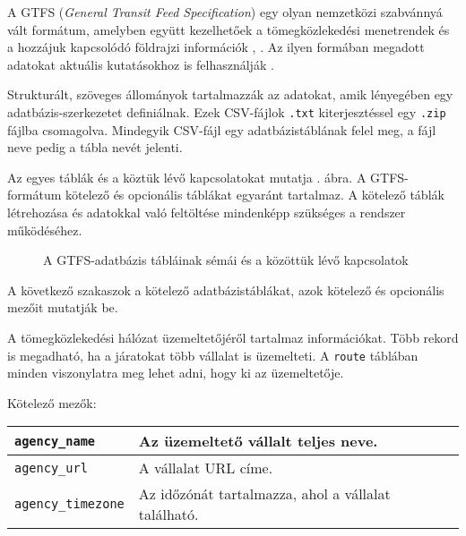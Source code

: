 
A GTFS (\textit{General Transit Feed Specification}) egy olyan nemzetközi szabvánnyá vált formátum, amelyben együtt kezelhetőek a tömegközlekedési menetrendek és a hozzájuk kapcsolódó földrajzi információk \cite{gtfs}, \cite{gtfsspec}. Az ilyen formában megadott adatokat aktuális kutatásokhoz is felhasználják \cite{crowdsending}.

Strukturált, szöveges állományok tartalmazzák az adatokat, amik lényegében egy adatbázis-szerkezetet definiálnak. Ezek CSV-fájlok \texttt{.txt} kiterjesztéssel egy \texttt{.zip} fájlba csomagolva. Mindegyik CSV-fájl egy adatbázistáblának felel meg, a fájl neve pedig a tábla nevét jelenti.

Az egyes táblák és a köztük lévő kapcsolatokat mutatja . ábra. A GTFS-formátum kötelező és opcionális táblákat egyaránt tartalmaz. A kötelező táblák létrehozása és adatokkal való feltöltése mindenképp szükséges a rendszer működéséhez.


\begin{figure}
\centering

\caption{A GTFS-adatbázis tábláinak sémái és a közöttük lévő kapcsolatok}
\label{fig:gtfs}
\end{figure}


A következő szakaszok a kötelező adatbázistáblákat, azok kötelező és opcionális mezőit mutatják be.


A tömegközlekedési hálózat üzemeltetőjéről tartalmaz információkat. Több rekord is megadható, ha a járatokat több vállalat is üzemelteti. A \texttt{route} táblában minden viszonylatra meg lehet adni, hogy ki az üzemeltetője.

\medskip

\noindent Kötelező mezők:

\bigskip

\begin{tabular}{|p{3.5cm}|p{10cm}|}
\hline
\texttt{agency\_name} & Az üzemeltető vállalt teljes neve. \\
\hline
\texttt{agency\_url} & A vállalat URL címe. \\
\hline
\texttt{agency\_timezone} & Az időzónát tartalmazza, ahol a vállalat található. \\
\hline
\end{tabular}

